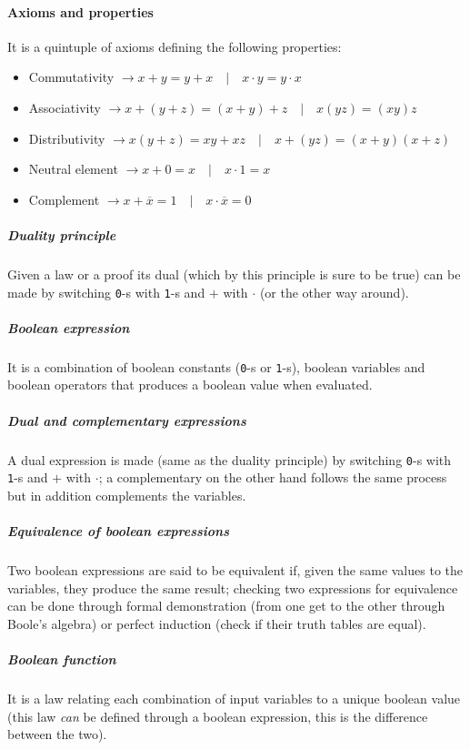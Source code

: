 \documentclass{scrartcl}
\newcommand{\zero}{\texttt{0}}
\newcommand{\one}{\texttt{1}}
\begin{document}
    \paragraph{Axioms and properties} It is a quintuple of axioms defining the following properties:
    \begin{itemize}
        \item Commutativity $\rightarrow x+y=y+x\quad|\quad x\cdot y=y\cdot x$
        \item Associativity $\rightarrow x+(y+z)=(x+y)+z\quad|\quad x(yz)=(xy)z$
        \item Distributivity $\rightarrow x(y+z)=xy+xz\quad|\quad x+(yz)=(x+y)(x+z)$
        \item Neutral element $\rightarrow x+0=x\quad|\quad x\cdot 1=x$
        \item Complement $\rightarrow x+\overline{x}=1\quad|\quad x\cdot\overline{x}=0$
    \end{itemize}
    \subparagraph{Duality principle} Given a law or a proof its dual (which by this principle is sure to be true) can be made by switching \zero-s with \one-s and $+$ with $\cdot$ (or the other way around).
    \subparagraph{Boolean expression} It is a combination of boolean constants (\zero-s or \one-s), boolean variables and boolean operators that produces a boolean value when evaluated. 
    \subparagraph{Dual and complementary expressions} A dual expression is made (same as the duality principle) by switching \zero-s with \one-s and $+$ with $\cdot$; a complementary on the other hand follows the same process but in addition complements the variables.
    \subparagraph{Equivalence of boolean expressions} Two boolean expressions are said to be equivalent if, given the same values to the variables, they produce the same result; checking two expressions for equivalence can be done through formal demonstration (from one get to the other through Boole's algebra) or perfect induction (check if their truth tables are equal).
    \subparagraph{Boolean function} It is a law relating each combination of input variables to a unique boolean value (this law \emph{can} be defined through a boolean expression, this is the difference between the two).
\end{document}
